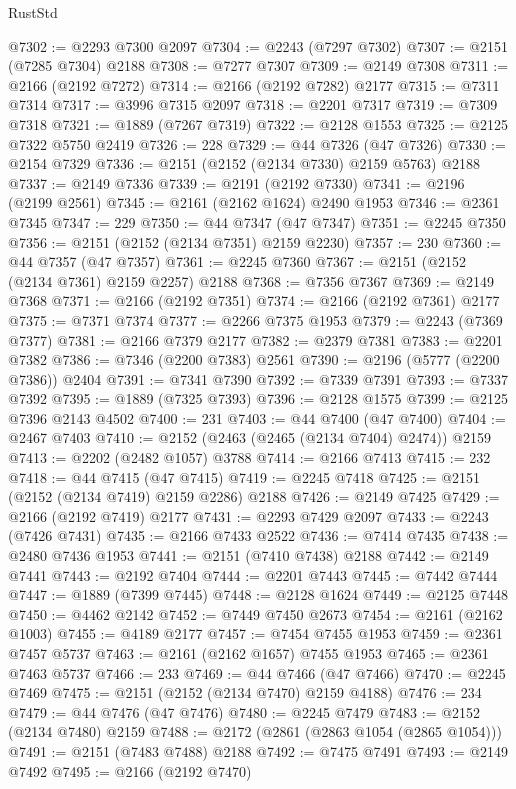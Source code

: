 \begin{lexlean}{RustStd}
\begin{coremodule}
@7302 := @2293 @7300 @2097
@7304 := @2243 (@7297 @7302)
@7307 := @2151 (@7285 @7304) @2188
@7308 := @7277 @7307
@7309 := @2149 @7308
@7311 := @2166 (@2192 @7272)
@7314 := @2166 (@2192 @7282) @2177
@7315 := @7311 @7314
@7317 := @3996 @7315 @2097
@7318 := @2201 @7317
@7319 := @7309 @7318
@7321 := @1889 (@7267 @7319)
@7322 := @2128 @1553
@7325 := @2125 @7322 @5750 @2419
@7326 := 228
@7329 := @44 @7326 (@47 @7326)
@7330 := @2154 @7329
@7336 := @2151 (@2152 (@2134 @7330) @2159 @5763) @2188
@7337 := @2149 @7336
@7339 := @2191 (@2192 @7330)
@7341 := @2196 (@2199 @2561)
@7345 := @2161 (@2162 @1624) @2490 @1953
@7346 := @2361 @7345
@7347 := 229
@7350 := @44 @7347 (@47 @7347)
@7351 := @2245 @7350
@7356 := @2151 (@2152 (@2134 @7351) @2159 @2230)
@7357 := 230
@7360 := @44 @7357 (@47 @7357)
@7361 := @2245 @7360
@7367 := @2151 (@2152 (@2134 @7361) @2159 @2257) @2188
@7368 := @7356 @7367
@7369 := @2149 @7368
@7371 := @2166 (@2192 @7351)
@7374 := @2166 (@2192 @7361) @2177
@7375 := @7371 @7374
@7377 := @2266 @7375 @1953
@7379 := @2243 (@7369 @7377)
@7381 := @2166 @7379 @2177
@7382 := @2379 @7381
@7383 := @2201 @7382
@7386 := @7346 (@2200 @7383) @2561
@7390 := @2196 (@5777 (@2200 @7386)) @2404
@7391 := @7341 @7390
@7392 := @7339 @7391
@7393 := @7337 @7392
@7395 := @1889 (@7325 @7393)
@7396 := @2128 @1575
@7399 := @2125 @7396 @2143 @4502
@7400 := 231
@7403 := @44 @7400 (@47 @7400)
@7404 := @2467 @7403
@7410 := @2152 (@2463 (@2465 (@2134 @7404) @2474)) @2159
@7413 := @2202 (@2482 @1057) @3788
@7414 := @2166 @7413
@7415 := 232
@7418 := @44 @7415 (@47 @7415)
@7419 := @2245 @7418
@7425 := @2151 (@2152 (@2134 @7419) @2159 @2286) @2188
@7426 := @2149 @7425
@7429 := @2166 (@2192 @7419) @2177
@7431 := @2293 @7429 @2097
@7433 := @2243 (@7426 @7431)
@7435 := @2166 @7433 @2522
@7436 := @7414 @7435
@7438 := @2480 @7436 @1953
@7441 := @2151 (@7410 @7438) @2188
@7442 := @2149 @7441
@7443 := @2192 @7404
@7444 := @2201 @7443
@7445 := @7442 @7444
@7447 := @1889 (@7399 @7445)
@7448 := @2128 @1624
@7449 := @2125 @7448
@7450 := @4462 @2142
@7452 := @7449 @7450 @2673
@7454 := @2161 (@2162 @1003)
@7455 := @4189 @2177
@7457 := @7454 @7455 @1953
@7459 := @2361 @7457 @5737
@7463 := @2161 (@2162 @1657) @7455 @1953
@7465 := @2361 @7463 @5737
@7466 := 233
@7469 := @44 @7466 (@47 @7466)
@7470 := @2245 @7469
@7475 := @2151 (@2152 (@2134 @7470) @2159 @4188)
@7476 := 234
@7479 := @44 @7476 (@47 @7476)
@7480 := @2245 @7479
@7483 := @2152 (@2134 @7480) @2159
@7488 := @2172 (@2861 (@2863 @1054 (@2865 @1054)))
@7491 := @2151 (@7483 @7488) @2188
@7492 := @7475 @7491
@7493 := @2149 @7492
@7495 := @2166 (@2192 @7470)

\end{coremodule}
\end{lexlean}
